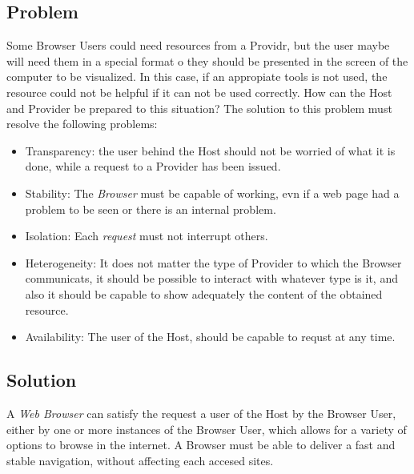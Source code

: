 \documentclass{sig-alternate-05-2015}
\begin{document}
  \subsection*{Problem}
  Some Browser Users could need resources from a Providr, but the user maybe will need them in a special format o they should be presented in the screen of the computer to be visualized. In this case, if an appropiate tools is not used, the resource could not be helpful if it can not be used correctly. How can the Host and Provider be prepared to this situation? The solution to this problem must resolve the following problems:
  \begin{itemize}
    \item Transparency: the user behind the Host should not be worried of what it is done, while a request to a Provider has been issued. 
    \item Stability: The \textit{Browser} must be capable of working, evn if a web page had a problem to be seen or there is an internal problem.
    \item Isolation: Each \textit{request} must not interrupt others.
    \item Heterogeneity: It does not matter the type of Provider to which the Browser communicats, it should be possible to interact with whatever type is it, and also it should be capable to show adequately the content of the obtained resource.
    \item Availability: The user of the Host, should be capable to requst at any time.
  \end{itemize}

  \subsection*{Solution}
  A \textit{Web Browser} can satisfy the request a user of the Host by the Browser User, either by one or more instances of the Browser User, which allows for a variety of options to browse in the internet. A Browser must be able to deliver a fast and stable navigation, without affecting each accesed sites.
\end{document}
